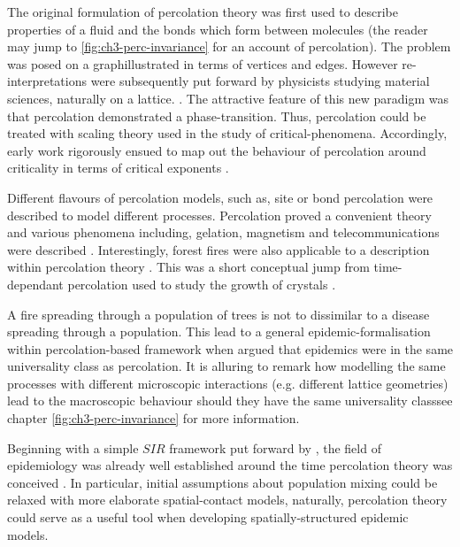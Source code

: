 The original formulation of percolation theory was first used to describe properties of a fluid and the bonds which form between molecules \cite{perco_origin} (the reader may jump to \ref{fig:ch3-perc-invariance} for an account of percolation). The problem was posed on a graph\textemdash illustrated in terms of vertices and edges. However re-interpretations were subsequently put forward by physicists studying material sciences, naturally on a lattice. \cite{Essam_1980}. The attractive feature of this new paradigm was that percolation demonstrated a phase-transition. Thus, percolation could be treated with scaling theory used in the study of critical-phenomena. Accordingly, early work rigorously ensued to map out the behaviour of percolation around criticality in terms of critical exponents \cite{STAUFFER19791}. 

Different flavours of percolation models, such as, site or bond percolation were described to model different processes. Percolation proved a convenient theory and various phenomena including, gelation, magnetism and telecommunications were described \cite{trove.nla.gov.au/work/26493727}. Interestingly, forest fires were also applicable to a description within percolation theory \cite{MacKay_1984}. This was a short conceptual jump from time-dependant percolation used to study the growth of crystals \cite{Family_1985}. 

A fire spreading through a population of trees is not to dissimilar to a disease spreading through a population. This lead to a general epidemic-formalisation within percolation-based framework when \cite{pub.1059067807} argued that epidemics were in the same universality class as percolation. It is alluring to remark how modelling the same processes with different microscopic interactions (e.g. different lattice geometries) lead to the macroscopic behaviour should they have the same universality class\textemdash see chapter \ref{fig:ch3-perc-invariance} for more information.

Beginning with a simple $SIR$ framework put forward by \cite{kermack-model}, the field of epidemiology was already well established around the time percolation theory was conceived \cite{baily1975mathematical}. In particular, initial assumptions about population mixing could be relaxed with more elaborate spatial-contact models, naturally, percolation theory could serve as a useful tool when developing spatially-structured epidemic models.

